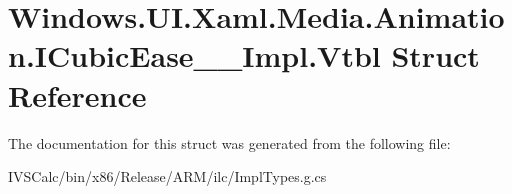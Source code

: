 \hypertarget{struct_windows_1_1_u_i_1_1_xaml_1_1_media_1_1_animation_1_1_i_cubic_ease_____impl_1_1_vtbl}{}\section{Windows.\+U\+I.\+Xaml.\+Media.\+Animation.\+I\+Cubic\+Ease\+\_\+\+\_\+\+Impl.\+Vtbl Struct Reference}
\label{struct_windows_1_1_u_i_1_1_xaml_1_1_media_1_1_animation_1_1_i_cubic_ease_____impl_1_1_vtbl}


The documentation for this struct was generated from the following file\+:\begin{DoxyCompactItemize}
\item 
I\+V\+S\+Calc/bin/x86/\+Release/\+A\+R\+M/ilc/Impl\+Types.\+g.\+cs\end{DoxyCompactItemize}
